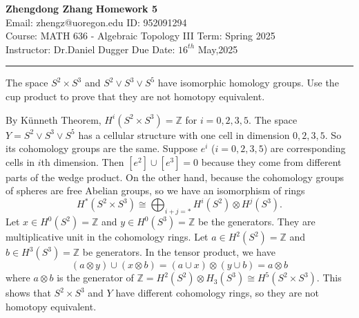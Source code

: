 \documentclass[letterpaper, 12pt]{article}
\begin{document}
\noindent
\large\textbf{Zhengdong Zhang} \hfill \textbf{Homework 5}  \\
Email: zhengz@uoregon.edu \hfill ID: 952091294  \\
\normalsize Course: MATH 636 - Algebraic Topology III \hfill Term: Spring 2025 \\
Instructor: Dr.Daniel Dugger \hfill Due Date: $16^{th}$ May,2025  \\
\noindent\rule{7in}{2.8pt}
\begin{problem}{1}
The space \(S^2\times S^3\) and \(S^2\vee S^3\vee S^5\) have isomorphic homology groups. Use the cup product to prove that they are not homotopy equivalent.
\end{problem}
\begin{solution}
By Künneth Theorem, \(H^i(S^2\times S^3)=\mathbb{Z}\) for \(i=0,2,3,5\). The space \(Y=S^2\vee S^3\vee S^5\) has a cellular structure with one cell in dimension \(0,2,3,5\). So its cohomology groups are the same. Suppose \(e^i\) (\(i=0,2,3,5\)) are corresponding cells in \(i\)th dimension. Then \([e^2]\cup[e^3]=0\) because they come from different parts of the wedge product. On the other hand, because the cohomology groups of spheres are free Abelian groups, so we have an isomorphism of rings 
\[H^*(S^2\times S^3)\cong \bigoplus_{i+j=*}H^i(S^2)\otimes H^j(S^3).\]
Let \(x\in H^0(S^2)=\mathbb{Z}\) and \(y\in H^0(S^3)=\mathbb{Z}\) be the generators. They are multiplicative unit in the cohomology rings. Let \(a\in H^2(S^2)=\mathbb{Z}\) and \(b\in H^3(S^3)=\mathbb{Z}\) be generators. In the tensor product, we have 
\[(a\otimes y)\cup (x\otimes b)=(a\cup x)\otimes (y\cup b)=a\otimes b\]
where \(a\otimes b\) is the generator of \(\mathbb{Z}=H^2(S^2)\otimes H_3(S^3)\cong H^5(S^2\times S^3)\). This shows that \(S^2\times S^3\) and \(Y\) have different cohomology rings, so they are not homotopy equivalent. 
\end{solution}
\end{document}
